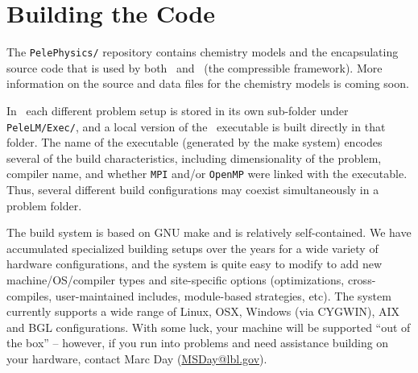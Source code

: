 
\section{Building the Code}

The {\tt PelePhysics/} repository contains chemistry models and the encapsulating source 
code that is used by both \pelelm\ and \pelec\ (the compressible framework).  More
information on the source and data files for the chemistry models is coming soon.

In \pelelm\ each different problem setup is stored in its own
sub-folder under {\tt PeleLM/Exec/}, and a local version of the 
\pelelm\ executable is built directly in that folder.  The name of the executable (generated by the make
system) encodes several of the build characteristics, including dimensionality of the problem,
compiler name, and whether {\tt MPI} and/or {\tt OpenMP} were linked with the executable.
Thus, several different build configurations may coexist simultaneously in a problem folder.

The build system is based on GNU make and is relatively self-contained.  We have accumulated 
specialized building setups over the years for a wide variety of hardware configurations, and 
the system is quite easy to modify to add new machine/OS/compiler types and site-specific 
options (optimizations, cross-compiles, user-maintained includes, module-based strategies, etc).
The system currently supports a wide range of Linux, OSX, Windows (via CYGWIN), AIX and BGL 
configurations. With some luck, your machine will be supported ``out of the box'' -- however, if 
you run into problems and need assistance building on your hardware, contact Marc Day (\url{MSDay@lbl.gov}).

